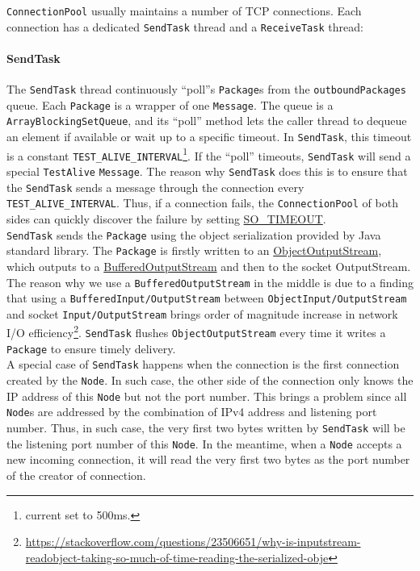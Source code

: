 \documentclass{article}
\numberwithin{equation}{section}
\begin{document}
\verb|ConnectionPool| usually maintains a number of TCP connections. Each connection has a dedicated \verb|SendTask| thread and a \verb|ReceiveTask| thread:

\paragraph{SendTask}The \verb|SendTask| thread continuously ``poll''s \verb|Package|s from the \verb|outboundPackages| queue. Each \verb|Package| is a wrapper of one \verb|Message|. The queue is a \verb|ArrayBlockingSetQueue|, and its ``poll'' method lets the caller thread to dequeue an element if available or wait up to a specific timeout. In \verb|SendTask|, this timeout is a constant \verb|TEST_ALIVE_INTERVAL|\footnote{current set to 500ms.}. If the ``poll'' timeouts, \verb|SendTask| will send a special \verb|TestAlive| \verb|Message|. The reason why \verb|SendTask| does this is to ensure that the \verb|SendTask| sends a message through the connection every \verb|TEST_ALIVE_INTERVAL|. Thus, if a connection fails, the \verb|ConnectionPool| of both sides can quickly discover the failure by setting \href{https://docs.oracle.com/javase/8/docs/api/java/net/Socket.html#setSoTimeout-int-}{SO\_TIMEOUT}.\\

\verb|SendTask| sends the \verb|Package| using the object serialization provided by Java standard library. The \verb|Package| is firstly written to an \href{https://docs.oracle.com/javase/8/docs/api/java/io/ObjectOutputStream.html}{ObjectOutputStream}, which outputs to a \href{https://docs.oracle.com/javase/8/docs/api/java/io/BufferedOutputStream.html}{BufferedOutputStream} and then to the socket OutputStream. The reason why we use a \verb|BufferedOutputStream| in the middle is due to a finding that using a \verb|BufferedInput/OutputStream| between \verb|ObjectInput/OutputStream| and socket \verb|Input/OutputStream| brings order of magnitude increase in network I/O efficiency\footnote{\href{https://stackoverflow.com/questions/23506651/why-is-inputstream-readobject-taking-so-much-of-time-reading-the-serialized-obje}{https://stackoverflow.com/questions/23506651/why-is-inputstream-readobject-taking-so-much-of-time-reading-the-serialized-obje}}. \verb|SendTask| flushes \verb|ObjectOutputStream| every time it writes a \verb|Package| to ensure timely delivery.\\

A special case of \verb|SendTask| happens when the connection is the first connection created by the \verb|Node|. In such case, the other side of the connection only knows the IP address of this \verb|Node| but not the port number. This brings a problem since all \verb|Node|s are addressed by the combination of IPv4 address and listening port number. Thus, in such case, the very first two bytes written by \verb|SendTask| will be the listening port number of this \verb|Node|. In the meantime, when a \verb|Node| accepts a new incoming connection, it will read the very first two bytes as the port number of the creator of connection.
\end{document}
